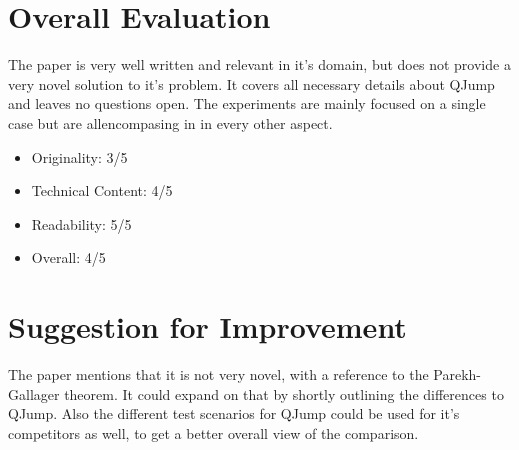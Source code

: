 \documentclass[a4paper]{article}
\begin{document}
\setcounter{secnumdepth}{0}
\section{Overall Evaluation}
The paper is very well written and relevant in it's domain, but does not provide a very novel solution to it's problem. It covers all necessary details about QJump and leaves no questions open. The experiments are mainly focused on a single case but are allencompasing in in every other aspect.
\begin{itemize}
	\setlength{\itemsep}{-4pt}
	\item Originality: 3/5
	\item Technical Content: 4/5
	\item Readability: 5/5
	\item Overall: 4/5
\end{itemize}

\setcounter{secnumdepth}{0}
\section{Suggestion for Improvement}
The paper mentions that it is not very novel, with a reference to the Parekh-Gallager theorem. It could expand on that by shortly outlining the differences to QJump. Also the different test scenarios for QJump could be used for it's competitors as well, to get a better overall view of the comparison.
\end{document}
